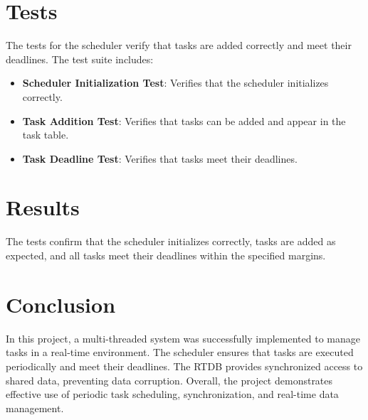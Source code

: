 \documentclass[a4paper,12pt]{article}
\begin{document}
\section{Tests}
The tests for the scheduler verify that tasks are added correctly and meet their deadlines. The test suite includes:
\begin{itemize}
    \item \textbf{Scheduler Initialization Test}: Verifies that the scheduler initializes correctly.
    \item \textbf{Task Addition Test}: Verifies that tasks can be added and appear in the task table.
    \item \textbf{Task Deadline Test}: Verifies that tasks meet their deadlines.
\end{itemize}

\section{Results}
The tests confirm that the scheduler initializes correctly, tasks are added as expected, and all tasks meet their deadlines within the specified margins.

\section{Conclusion}
In this project, a multi-threaded system was successfully implemented to manage tasks in a real-time environment. The scheduler ensures that tasks are executed periodically and meet their deadlines. The RTDB provides synchronized access to shared data, preventing data corruption. Overall, the project demonstrates effective use of periodic task scheduling, synchronization, and real-time data management.
\end{document}
